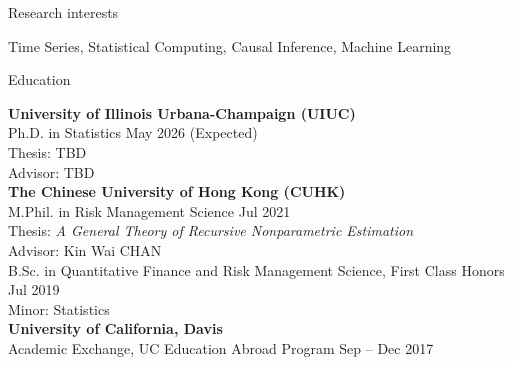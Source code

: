 \documentclass[10pt]{resume} %
\begin{document}

\begin{rSection}{Research interests}

Time Series, Statistical Computing, Causal Inference, Machine Learning

\end{rSection}


\begin{rSection}{Education}

{\bf University of Illinois Urbana-Champaign (UIUC)} \\
Ph.D. in Statistics  \hfill {May 2026 (Expected)} \\
\hspace*{1em} Thesis: TBD \\
\hspace*{1em} Advisor: TBD \smallskip \\
{\bf The Chinese University of Hong Kong (CUHK)} \\
M.Phil. in Risk Management Science \hfill {Jul 2021} \\
\hspace*{1em} Thesis: \textit{A General Theory of Recursive Nonparametric Estimation} \\
\hspace*{1em} Advisor: Kin Wai CHAN \smallskip \\
B.Sc. in Quantitative Finance and Risk Management Science, First Class Honors \hfill {Jul 2019} \\
\hspace*{1em} Minor: Statistics \smallskip \\
{\bf University of California, Davis} \\
Academic Exchange, UC Education Abroad Program  \hfill {Sep -- Dec 2017}

\end{rSection}

\end{document}
